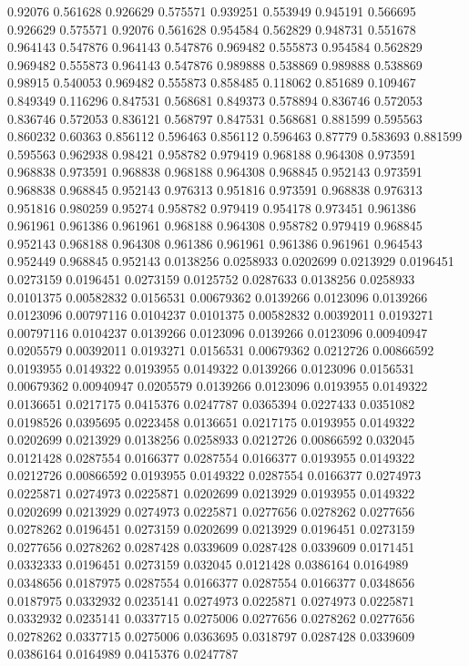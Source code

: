0.92076 0.561628
0.926629 0.575571
0.939251 0.553949
0.945191 0.566695
0.926629 0.575571
0.92076 0.561628
0.954584 0.562829
0.948731 0.551678
0.964143 0.547876
0.964143 0.547876
0.969482 0.555873
0.954584 0.562829
0.969482 0.555873
0.964143 0.547876
0.989888 0.538869
0.989888 0.538869
0.98915 0.540053
0.969482 0.555873
0.858485 0.118062
0.851689 0.109467
0.849349 0.116296
0.847531 0.568681
0.849373 0.578894
0.836746 0.572053
0.836746 0.572053
0.836121 0.568797
0.847531 0.568681
0.881599 0.595563
0.860232 0.60363
0.856112 0.596463
0.856112 0.596463
0.87779 0.583693
0.881599 0.595563
0.962938 0.98421
0.958782 0.979419
0.968188 0.964308
0.973591 0.968838
0.973591 0.968838
0.968188 0.964308
0.968845 0.952143
0.973591 0.968838
0.968845 0.952143
0.976313 0.951816
0.973591 0.968838
0.976313 0.951816
0.980259 0.95274
0.958782 0.979419
0.954178 0.973451
0.961386 0.961961
0.961386 0.961961
0.968188 0.964308
0.958782 0.979419
0.968845 0.952143
0.968188 0.964308
0.961386 0.961961
0.961386 0.961961
0.964543 0.952449
0.968845 0.952143
0.0138256 0.0258933
0.0202699 0.0213929
0.0196451 0.0273159
0.0196451 0.0273159
0.0125752 0.0287633
0.0138256 0.0258933
0.0101375 0.00582832
0.0156531 0.00679362
0.0139266 0.0123096
0.0139266 0.0123096
0.00797116 0.0104237
0.0101375 0.00582832
0.00392011 0.0193271
0.00797116 0.0104237
0.0139266 0.0123096
0.0139266 0.0123096
0.00940947 0.0205579
0.00392011 0.0193271
0.0156531 0.00679362
0.0212726 0.00866592
0.0193955 0.0149322
0.0193955 0.0149322
0.0139266 0.0123096
0.0156531 0.00679362
0.00940947 0.0205579
0.0139266 0.0123096
0.0193955 0.0149322
0.0136651 0.0217175
0.0415376 0.0247787
0.0365394 0.0227433
0.0351082 0.0198526
0.0395695 0.0223458
0.0136651 0.0217175
0.0193955 0.0149322
0.0202699 0.0213929
0.0138256 0.0258933
0.0212726 0.00866592
0.032045 0.0121428
0.0287554 0.0166377
0.0287554 0.0166377
0.0193955 0.0149322
0.0212726 0.00866592
0.0193955 0.0149322
0.0287554 0.0166377
0.0274973 0.0225871
0.0274973 0.0225871
0.0202699 0.0213929
0.0193955 0.0149322
0.0202699 0.0213929
0.0274973 0.0225871
0.0277656 0.0278262
0.0277656 0.0278262
0.0196451 0.0273159
0.0202699 0.0213929
0.0196451 0.0273159
0.0277656 0.0278262
0.0287428 0.0339609
0.0287428 0.0339609
0.0171451 0.0332333
0.0196451 0.0273159
0.032045 0.0121428
0.0386164 0.0164989
0.0348656 0.0187975
0.0287554 0.0166377
0.0287554 0.0166377
0.0348656 0.0187975
0.0332932 0.0235141
0.0274973 0.0225871
0.0274973 0.0225871
0.0332932 0.0235141
0.0337715 0.0275006
0.0277656 0.0278262
0.0277656 0.0278262
0.0337715 0.0275006
0.0363695 0.0318797
0.0287428 0.0339609
0.0386164 0.0164989
0.0415376 0.0247787
